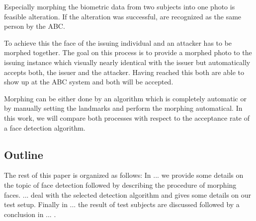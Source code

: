 Especially morphing the biometric data from two subjects into one photo is feasible alteration. If the alteration was successful, are recognized as the same person by the ABC. 

To achieve this the face of the issuing individual and an attacker has to be morphed together. The goal on this process is to provide a morphed photo to the issuing instance which visually nearly identical with the issuer but automatically accepts both, the issuer and the attacker. Having reached this both are able to show up at the ABC system and both will be accepted. 

Morphing can be either done by an algorithm which is completely automatic or by manually setting the landmarks and perform the morphing automatical. In this work, we will compare both processes with respect to the acceptance rate of a face detection algorithm. 

\subsection{Outline}
The rest of this paper is organized as follows: In ... we provide some details on the topic of face detection followed by describing the procedure of morphing faces. ... deal with the selected detection algorithm and gives some details on our test setup. Finally in ... the result of test subjects are discussed followed by a conclusion in ... .
 